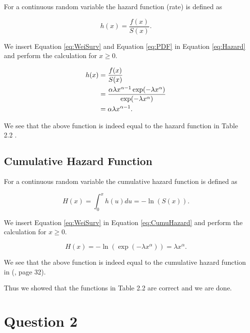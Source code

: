 \documentclass[a4paper,oneside]{memoir}
\begin{document}
For a continuous random variable the hazard function (rate) is defined as

\begin{equation}
h(x)= \frac{f(x)}{S(x)}. \label{eq:Hazard}
\end{equation}

We insert Equation \eqref{eq:WeiSurv} and Equation \eqref{eq:PDF} in Equation \eqref{eq:Hazard} and perform the calculation for \(x\geq 0\).

\begin{align}
h(x)&= \frac{f(x)}{S(x)} \notag \\
    &=\frac{\alpha\lambda x^{\alpha-1}\exp(-\lambda x^\alpha)}{\exp(-\lambda x^\alpha)} \notag \\
    &=\alpha\lambda x^{\alpha-1}. \label{eq:WeiHazard}
\end{align}

We see that the above function is indeed equal to the hazard function in Table 2.2 \citep{Klein2003}.

\hypertarget{cumulative-hazard-function}{%
\subsection{Cumulative Hazard Function}\label{cumulative-hazard-function}}

For a continuous random variable the cumulative hazard function is defined as

\begin{equation}
H(x)= \int_0^x h(u) du = -\ln(S(x)). \label{eq:CumuHazard}
\end{equation}

We insert Equation \eqref{eq:WeiSurv} in Equation \eqref{eq:CumuHazard} and perform the calculation for \(x\geq 0\).

\begin{equation}
H(x) = -\ln(\exp(-\lambda x^\alpha))=\lambda x^\alpha. \label{eq:WeiCumuHazard}
\end{equation}

We see that the above function is indeed equal to the cumulative hazard function in (\citet{Klein2003}, page 32).

Thus we showed that the functions in Table 2.2 \citep{Klein2003} are correct and we are done.

\hypertarget{question-2}{%
\section{Question 2}\label{question-2}}
\end{document}

